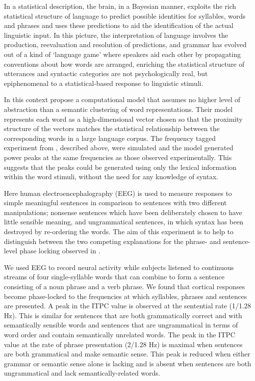 \documentclass[a4paper,10pt,twoside]{article}
\begin{document}
In a statistical description, the brain, in a Bayesian manner,
exploits the rich statistical structure of language to predict
possible identities for syllables, words and phrases and uses these
predictions to aid the identification of the actual linguistic
input. In this picture, the interpretation of language involves the
production, reevaluation and resolution of predictions, and grammar
has evolved out of a kind of \lq{}language game\rq{} where speakers
aid each other by propagating conventions about how words are
arranged, enriching the statistical structure of utterances and
syntactic categories are not psychologically real, but epiphenomenal
to a statistical-based response to linguistic stimuli.

In this context \cite{FrankYang2018} propose a computational model
that assumes no higher level of abstraction than a semantic clustering
of word representations. Their model represents each word as a
high-dimensional vector chosen so that the proximity structure of the
vectors matches the statistical relationship between the corresponding
words in a large language corpus. The frequency tagged experiment from
\cite{DingEtAl2016}, described above, were simulated and the model
generated power peaks at the same frequencies as those observed
experimentally. This suggests that the peaks could be generated using
only the lexical information within the word stimuli, without the need
for any knowledge of syntax.

Here human electroencephalography (EEG) is used to measure responses
to simple meaningful sentences in comparison to sentences with two
different manipulations; nonsense sentences which have been
deliberately chosen to have little sensible meaning, and ungrammatical
sentences, in which syntax has been destroyed by re-ordering the
words. The aim of this experiment is to help to distinguish between
the two competing explanations for the phrase- and sentence-level
phase locking observed in \cite{DingEtAl2016,DingEtAl2017}.

We used EEG to record neural activity while subjects listened to
continuous streams of four single-syllable words that can combine to
form a sentence consisting of a noun phrase and a verb phrase. We
found that cortical responses become phase-locked to the frequencies
at which syllables, phrases and sentences are presented. A peak in the
ITPC value is observed at the sentential rate (1/1.28 Hz). This is
similar for sentences that are both grammatically correct and with
semantically sensible words and sentences that are ungrammatical in
terms of word order and contain semantically unrelated words. The peak
in the ITPC value at the rate of phrase presentation (2/1.28 Hz) is
maximal when sentences are both grammatical and make semantic
sense. This peak is reduced when either grammar or semantic sense
alone is lacking and is absent when sentences are both ungrammatical
and lack semantically-related words.
\end{document}
